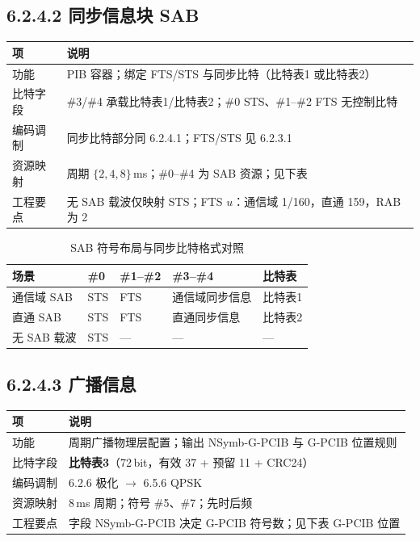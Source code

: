 \documentclass[11pt,a4paper]{ctexart}
\begin{document}
\subsection{6.2.4.2 同步信息块 SAB}

\begin{table}[h]
\centering
\small
\begin{tabular}{L{2.2cm}L{10.8cm}}
\toprule
\textbf{项} & \textbf{说明} \\
\midrule
功能 & PIB 容器；绑定 FTS/STS 与同步比特（比特表1 或比特表2） \\
比特字段 & \#3/\#4 承载比特表1/比特表2；\#0 STS、\#1--\#2 FTS 无控制比特 \\
编码调制 & 同步比特部分同 6.2.4.1；FTS/STS 见 6.2.3.1 \\
资源映射 & 周期 $\{2,4,8\}$\,ms；\#0--\#4 为 SAB 资源；见下表 \\
工程要点 & 无 SAB 载波仅映射 STS；FTS $u$：通信域 1/160，直通 159，RAB 为 2 \\
\bottomrule
\end{tabular}
\end{table}

\begin{table}[h]
\centering
\small
\caption{SAB 符号布局与同步比特格式对照}
\begin{tabular}{L{3cm}lllL{2.8cm}}
\toprule
\textbf{场景} & \textbf{\#0} & \textbf{\#1--\#2} & \textbf{\#3--\#4} & \textbf{比特表} \\
\midrule
通信域 SAB & STS & FTS & 通信域同步信息 & 比特表1 \\
直通 SAB & STS & FTS & 直通同步信息 & 比特表2 \\
无 SAB 载波 & STS & --- & --- & --- \\
\bottomrule
\end{tabular}
\end{table}

\subsection{6.2.4.3 广播信息}

\begin{table}[h]
\centering
\small
\begin{tabular}{L{2.2cm}L{10.8cm}}
\toprule
\textbf{项} & \textbf{说明} \\
\midrule
功能 & 周期广播物理层配置；输出 NSymb-G-PCIB 与 G-PCIB 位置规则 \\
比特字段 & \textbf{比特表3}（72\,bit，有效 37 + 预留 11 + CRC24） \\
编码调制 & 6.2.6 极化 $\rightarrow$ 6.5.6 QPSK \\
资源映射 & 8\,ms 周期；符号 \#5、\#7；先时后频 \\
工程要点 & 字段 NSymb-G-PCIB 决定 G-PCIB 符号数；见下表 G-PCIB 位置 \\
\bottomrule
\end{tabular}
\end{table}
\end{document}
